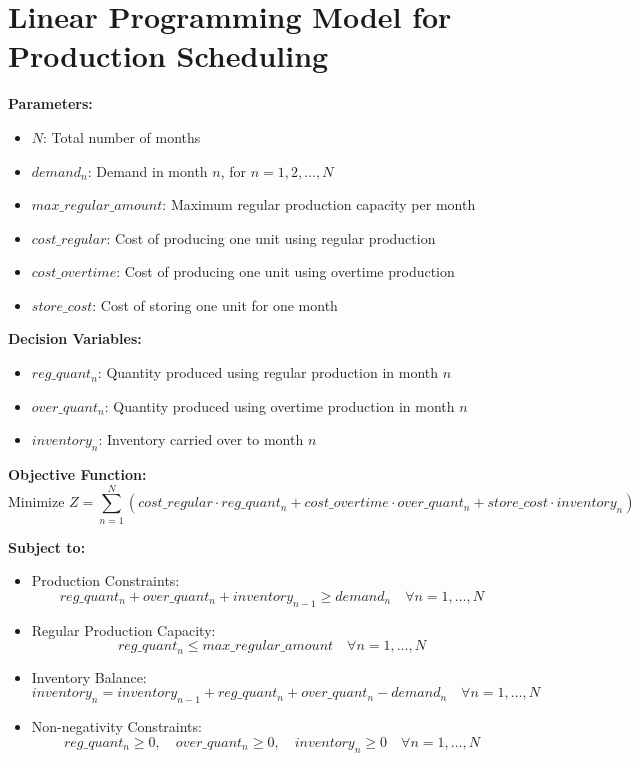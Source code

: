\documentclass{article}
\begin{document}
\section*{Linear Programming Model for Production Scheduling}

\textbf{Parameters:}
\begin{itemize}
    \item $N$: Total number of months
    \item $demand_{n}$: Demand in month $n$, for $n = 1, 2, \ldots, N$
    \item $max\_regular\_amount$: Maximum regular production capacity per month
    \item $cost\_regular$: Cost of producing one unit using regular production
    \item $cost\_overtime$: Cost of producing one unit using overtime production
    \item $store\_cost$: Cost of storing one unit for one month
\end{itemize}

\textbf{Decision Variables:}
\begin{itemize}
    \item $reg\_quant_{n}$: Quantity produced using regular production in month $n$
    \item $over\_quant_{n}$: Quantity produced using overtime production in month $n$
    \item $inventory_{n}$: Inventory carried over to month $n$
\end{itemize}

\textbf{Objective Function:}
\[
\text{Minimize } Z = \sum_{n=1}^{N} \left( cost\_regular \cdot reg\_quant_{n} + cost\_overtime \cdot over\_quant_{n} + store\_cost \cdot inventory_{n} \right)
\]

\textbf{Subject to:}
\begin{itemize}
    \item Production Constraints:
    \[
    reg\_quant_{n} + over\_quant_{n} + inventory_{n-1} \geq demand_{n} \quad \forall n = 1, \ldots, N
    \]
    
    \item Regular Production Capacity:
    \[
    reg\_quant_{n} \leq max\_regular\_amount \quad \forall n = 1, \ldots, N
    \]

    \item Inventory Balance:
    \[
    inventory_{n} = inventory_{n-1} + reg\_quant_{n} + over\_quant_{n} - demand_{n} \quad \forall n = 1, \ldots, N
    \]
    
    \item Non-negativity Constraints:
    \[
    reg\_quant_{n} \geq 0, \quad over\_quant_{n} \geq 0, \quad inventory_{n} \geq 0 \quad \forall n = 1, \ldots, N
    \]
\end{itemize}
\end{document}

